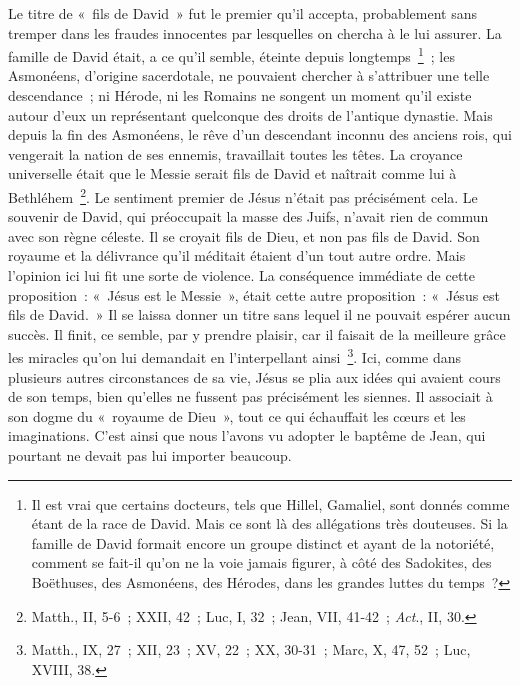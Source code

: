 \documentclass[french,twoside]{book} %
\begin{document}
Le titre de « fils de David » fut le premier qu’il accepta, probablement sans tremper dans les fraudes innocentes par lesquelles on chercha à le lui assurer. La famille de David était, a ce qu’il semble, éteinte depuis longtemps \footnote{ Il est vrai que certains docteurs, tels que Hillel, Gamaliel, sont donnés comme étant de la race de David. Mais ce sont là des allégations très douteuses. Si la famille de David formait encore un groupe distinct et ayant de la notoriété, comment se fait-il qu’on ne la voie jamais figurer, à côté des Sadokites, des Boëthuses, des Asmonéens, des Hérodes, dans les grandes luttes du temps ?} ; les Asmonéens, d’origine sacerdotale, ne pouvaient chercher à s’attribuer une telle descendance ; ni Hérode, ni les Romains ne songent un moment qu’il existe autour d’eux un représentant quelconque des droits de l’antique dynastie. Mais depuis la fin des Asmonéens, le rêve d’un descendant inconnu des anciens rois, qui vengerait la nation de ses ennemis, travaillait toutes les têtes. La croyance universelle était que le Messie serait fils de David et naîtrait comme lui à Bethléhem \footnote{ Matth., II, 5-6 ; XXII, 42 ; Luc, I, 32 ; Jean, VII, 41-42 ; {\itshape Act}., II, 30.}. Le sentiment premier de Jésus n’était pas précisément cela. Le souvenir de David, qui préoccupait la masse des Juifs, n’avait rien de commun avec son règne céleste. Il se croyait fils de Dieu, et non pas fils de David. Son royaume et la délivrance qu’il méditait étaient d’un tout autre ordre. Mais l’opinion ici lui fit une sorte de violence. La conséquence immédiate de cette proposition : « Jésus est le Messie », était cette autre proposition : « Jésus est fils de David. » Il se laissa donner un titre sans lequel il ne pouvait espérer aucun succès. Il finit, ce semble, par y prendre plaisir, car il faisait de la meilleure grâce les miracles qu’on lui demandait en l’interpellant ainsi \footnote{Matth., IX, 27 ; XII, 23 ; XV, 22 ; XX, 30-31 ; Marc, X, 47, 52 ; Luc, XVIII, 38.}. Ici, comme dans plusieurs autres circonstances de sa vie, Jésus se plia aux idées qui avaient cours de son temps, bien qu’elles ne fussent pas précisément les siennes. Il associait à son dogme du « royaume de Dieu », tout ce qui échauffait les cœurs et les imaginations. C’est ainsi que nous l’avons vu adopter le baptême de Jean, qui pourtant ne devait pas lui importer beaucoup.\par
\end{document}
